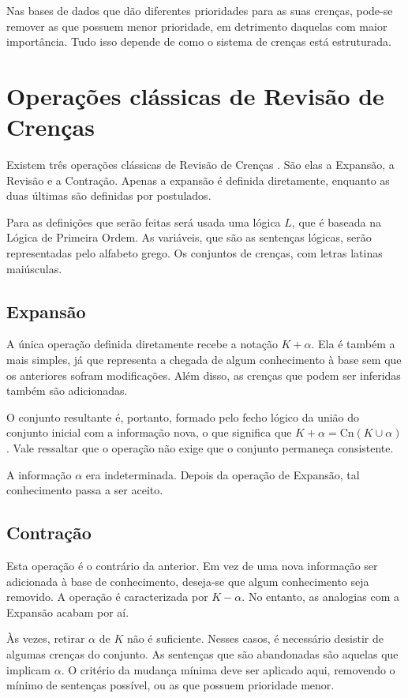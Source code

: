 Nas bases de dados que dão diferentes prioridades para as suas crenças, pode-se remover as que possuem menor prioridade, em detrimento daquelas com maior importância. Tudo isso depende de como o sistema de crenças está estruturada.

\section{Operações clássicas de Revisão de Crenças}

Existem três operações clássicas de Revisão de Crenças \citep{revisaoGardenfors3}. São elas a Expansão, a Revisão e a Contração. Apenas a expansão é definida diretamente, enquanto as duas últimas são definidas por postulados. 

Para as definições que serão feitas será usada uma lógica $ L $, que é baseada na Lógica de Primeira Ordem. As variáveis, que são as sentenças lógicas, serão representadas pelo alfabeto grego. Os conjuntos de crenças, com letras latinas maiúsculas.

\subsection{Expansão}

A única operação definida diretamente recebe a notação $ K + \alpha $. Ela é também a mais simples, já que representa a chegada de algum conhecimento à base sem que os anteriores sofram modificações. Além disso, as crenças que podem ser inferidas também são adicionadas.

O conjunto resultante é, portanto, formado pelo fecho lógico da união do conjunto inicial com a informação nova, o que significa que $ K + \alpha = \text{Cn}(K \cup \alpha) $. Vale ressaltar que o operação não exige que o conjunto permaneça consistente.

A informação $ \alpha $ era indeterminada. Depois da operação de Expansão, tal conhecimento passa a ser aceito.

\subsection{Contração}

Esta operação é o contrário da anterior. Em vez de uma nova informação ser adicionada à base de conhecimento, deseja-se que algum conhecimento seja removido. A operação é caracterizada por $ K - \alpha $. No entanto, as analogias com a Expansão acabam por aí.

Às vezes, retirar $ \alpha $ de $ K $ não é suficiente. Nesses casos, é necessário desistir de algumas crenças do conjunto. As sentenças que são abandonadas são aquelas que implicam $ \alpha $. O critério da mudança mínima deve ser aplicado aqui, removendo o mínimo de sentenças possível, ou as que possuem prioridade menor.

